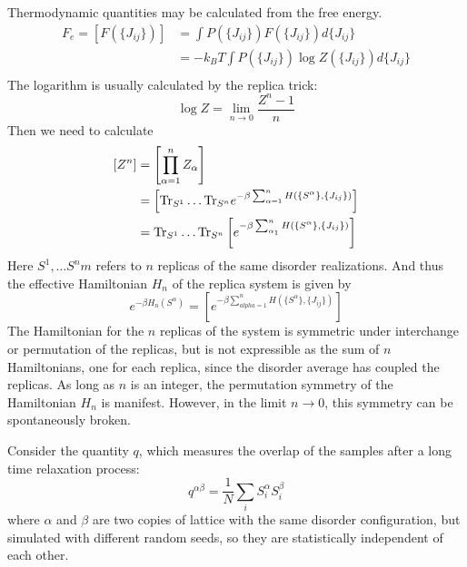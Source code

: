 Thermodynamic quantities may be calculated from the free energy. 
\begin{equation}
  \label{eq:32}
\begin{split}
  F_e=[F(\{J_{ij}\})]&=\int P(\{J_{ij}\}) F(\{J_{ij}\}) d\{J_{ij}\}\\
&=-k_BT\int P(\{J_{ij}\})\log Z(\{J_{ij}\}) d\{J_{ij}\}\\
\end{split}
\end{equation}
The logarithm is usually calculated by the replica trick:
\begin{equation}
  \label{eq:33}
  \log Z=\lim_{n\rightarrow 0}\frac{Z^n -1}{n}
\end{equation}
Then we need to calculate
\begin{equation}
  \label{eq:34}
  \begin{split}
    [Z^n]&=\left[\prod_{\alpha=1}^n Z_\alpha\right]\\
    &=\left[\text{Tr}_{S^1}\ldots\text{Tr}_{S^n}e^{-\beta\sum_{\alpha=1}^n H(\{S^\alpha\},\{J_{ij}\})}\right]\\
&=\text{Tr}_{S^1}\ldots\text{Tr}_{S^n}\left[e^{-\beta\sum_{\alpha_1}^n H(\{S^\alpha\},\{J_{ij}\})}\right]
  \end{split}
\end{equation}
Here ${S^1},\ldots S^{n}m$ refers to $n$ replicas of the same disorder realizations.
And thus the effective Hamiltonian $H_n$ of the replica system is given by
\begin{equation}
  \label{eq:35}
  e^{-\beta H_n({S^\alpha})}=\left[e^{-\beta\sum_{alpha=1}^n H(\{S^\alpha\},\{J_{ij}\})}\right]
\end{equation}
The Hamiltonian for the $n$ replicas of the system is symmetric under interchange
or permutation of the replicas, but is not expressible as the sum of $n$ Hamiltonians,
 one for each replica, since the disorder average has coupled the replicas. 
As long as $n$ is an integer, the permutation symmetry of the Hamiltonian $H_n$ 
is manifest. However, in the limit $n\rightarrow 0$, this symmetry can be spontaneously
broken.

Consider the quantity $q$, which measures the overlap of the samples after a long 
time relaxation process:
\begin{equation}
  \label{eq:q}
  q^{\alpha\beta}=\frac{1}{N}\sum_iS_i^\alpha S_i^\beta %
\end{equation}
where $\alpha$ and $\beta$ are two copies of lattice with the same disorder 
configuration, but simulated with different random seeds, so they are
statistically independent of each other. 

